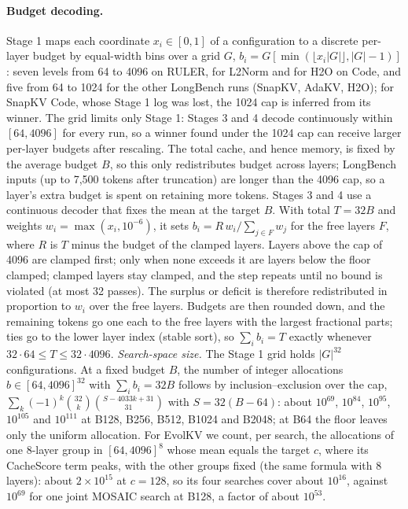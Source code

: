 \paragraph{Budget decoding.} Stage 1 maps each coordinate $x_i \in [0,1]$ of a configuration to a discrete per-layer budget by equal-width bins over a grid $G$, $b_i = G[\min(\lfloor x_i |G| \rfloor, |G|-1)]$: seven levels from 64 to 4096 on RULER, for L2Norm and for H2O on Code, and five from 64 to 1024 for the other LongBench runs (SnapKV, AdaKV, H2O); for SnapKV Code, whose Stage 1 log was lost, the 1024 cap is inferred from its winner. The grid limits only Stage 1: Stages 3 and 4 decode continuously within $[64, 4096]$ for every run, so a winner found under the 1024 cap can receive larger per-layer budgets after rescaling. The total cache, and hence memory, is fixed by the average budget $B$, so this only redistributes budget across layers; LongBench inputs (up to 7{,}500 tokens after truncation) are longer than the 4096 cap, so a layer's extra budget is spent on retaining more tokens. Stages 3 and 4 use a continuous decoder that fixes the mean at the target $B$. With total $T = 32B$ and weights $w_i = \max(x_i, 10^{-6})$, it sets $b_i = R\,w_i / \sum_{j \in F} w_j$ for the free layers $F$, where $R$ is $T$ minus the budget of the clamped layers. Layers above the cap of 4096 are clamped first; only when none exceeds it are layers below the floor clamped; clamped layers stay clamped, and the step repeats until no bound is violated (at most 32 passes). The surplus or deficit is therefore redistributed in proportion to $w_i$ over the free layers. Budgets are then rounded down, and the remaining tokens go one each to the free layers with the largest fractional parts; ties go to the lower layer index (stable sort), so $\sum_i b_i = T$ exactly whenever $32 \cdot 64 \le T \le 32 \cdot 4096$. \emph{Search-space size.} The Stage 1 grid holds $|G|^{32}$ configurations. At a fixed budget $B$, the number of integer allocations $b \in [64, 4096]^{32}$ with $\sum_i b_i = 32B$ follows by inclusion--exclusion over the cap, $\sum_k (-1)^k {32 \choose k}{S - 4033k + 31 \choose 31}$ with $S = 32(B - 64)$: about $10^{69}$, $10^{84}$, $10^{95}$, $10^{105}$ and $10^{111}$ at B128, B256, B512, B1024 and B2048; at B64 the floor leaves only the uniform allocation. For EvolKV we count, per search, the allocations of one 8-layer group in $[64, 4096]^8$ whose mean equals the target $c$, where its CacheScore term peaks, with the other groups fixed (the same formula with 8 layers): about $2\times10^{15}$ at $c = 128$, so its four searches cover about $10^{16}$, against $10^{69}$ for one joint MOSAIC search at B128, a factor of about $10^{53}$.

